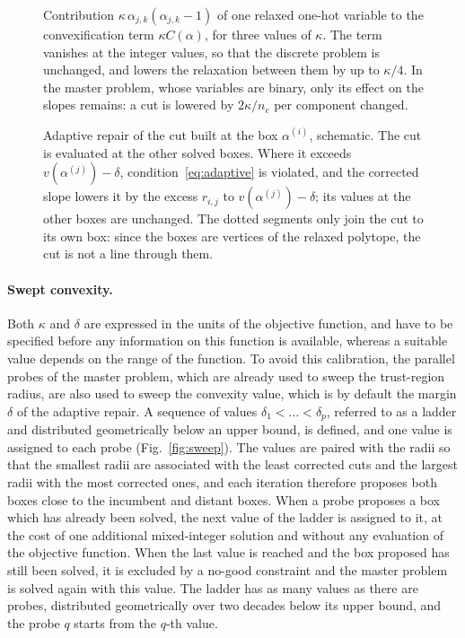 \documentclass[pdflatex,sn-basic]{sn-jnl}
\begin{document}
\begin{figure}[t]
  \centering
  
  \caption{Contribution $\kappa\,\alpha_{j,k}(\alpha_{j,k}-1)$ of one relaxed
    one-hot variable to the convexification term $\kappa C(\alpha)$, for three
    values of $\kappa$. The term vanishes at the integer values, so that the
    discrete problem is unchanged, and lowers the relaxation between them by up
    to $\kappa/4$. In the master problem, whose variables are binary, only its
    effect on the slopes remains: a cut is lowered by $2\kappa/n_c$ per
    component changed.}
  \label{fig:convexification}
\end{figure}

\begin{figure}[t]
  \centering
  
  \caption{Adaptive repair of the cut built at the box $\alpha^{(i)}$,
    schematic. The cut is evaluated at the other solved boxes. Where it exceeds
    $v(\alpha^{(j)}) - \delta$, condition~\eqref{eq:adaptive} is violated, and
    the corrected slope lowers it by the excess $r_{i,j}$ to
    $v(\alpha^{(j)}) - \delta$; its values at the other boxes are unchanged. The
    dotted segments only join the cut to its own box: since the boxes are
    vertices of the relaxed polytope, the cut is not a line through them.}
  \label{fig:repair}
\end{figure}

\paragraph{Swept convexity.} Both $\kappa$ and $\delta$ are expressed in the
units of the objective function, and have to be specified before any information
on this function is available, whereas a suitable value depends on the range of
the function. To avoid this calibration, the parallel probes of the master problem,
which are already used to sweep the trust-region radius, are also used to sweep
the convexity value, which is by default the margin $\delta$ of the adaptive
repair. A sequence of values $\delta_1 < \dots < \delta_p$, referred
to as a ladder and distributed geometrically below an upper bound, is defined,
and one value is assigned to each probe (Fig.~\ref{fig:sweep}). The values are paired with the radii so
that the smallest radii are associated with the least corrected cuts and the
largest radii with the most corrected ones, and each iteration therefore
proposes both boxes close to the incumbent and distant boxes. When a probe
proposes a box which has already been solved, the next value of the ladder is
assigned to it, at the cost of one additional mixed-integer solution and without
any evaluation of the objective function. When the last value is reached and
the box proposed has still been solved, it is excluded by a no-good constraint
and the master problem is solved again with this value. The ladder has as many
values as there are probes, distributed geometrically over two decades below its
upper bound, and the probe $q$ starts from the $q$-th value.
\end{document}
